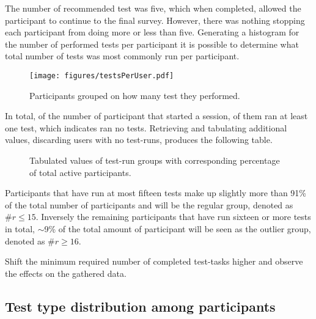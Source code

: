     The number of recommended test was five, which when completed, allowed
    the participant to continue to the final survey. However, there was
    nothing stopping each participant from doing more or less than five.
    Generating a histogram for the number of performed tests per
    participant it is possible to determine what total number of tests was most
    commonly run per participant.

		\vspace{-0.3cm}
    \begin{figure}[h!]
      \centering
      \texttt{[image: figures/testsPerUser.pdf]}
			\vspace{-0.2cm}
      \caption{Participants grouped on how many test they performed.}
    \end{figure}

    In total, of the  number of participant that
    started a session,  of them ran at least one
    test, which indicates  ran no tests. Retrieving and
    tabulating additional values, discarding users with no test-runs,
    produces the following table.

		\vspace{-0.2cm}
    \begin{figure}[h!]
      \centering
      \caption{%
        Tabulated values of test-run groups with corresponding percentage
        of total active participants.%
      }
    \end{figure}

    Participants that have run at most fifteen tests make up slightly more
    than 91\% of the total number of participants and will be the regular
    group, denoted as $\#r\leq15$. Inversely the remaining participants
    that have run sixteen or more tests in total, $\sim$9\% of the total
    amount of participant will be seen as the outlier group, denoted as
    $\#r\geq16$.

		\iterchange Shift the minimum required number of completed test-tasks
		higher and observe the effects on the gathered data.

  \subsection{Test type distribution among participants}

%
%
%


